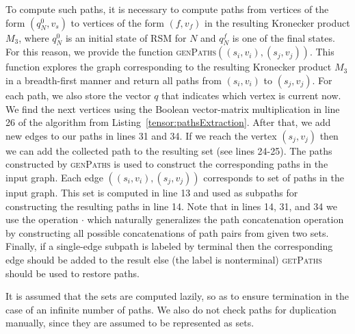To compute such paths, it is necessary to compute paths from vertices of the form $(q_N^0,v_s)$ to vertices of the form $(f, v_f)$ in the resulting Kronecker product $M_3$, where $q_N^0$ is an initial state of RSM for $N$ and $q_N^f$ is one of the final states.
For this reason, we provide the function \textsc{genPaths}$((s_i,v_i),(s_j,v_j))$. This function explores the graph corresponding to the resulting Kronecker product $M_3$ in a breadth-first manner and return all paths from $(s_i,v_i)$ to $(s_j,v_j)$. For each path, we also store the vector $q$ that indicates which vertex is current now. We find the next vertices using the Boolean vector-matrix multiplication in line 26 of the algorithm from Listing~\ref{tensor:pathsExtraction}. After that, we add new edges to our paths in lines 31 and 34. If we reach the vertex $(s_j,v_j)$ then we can add the collected path to the resulting set (see lines 24-25). The paths constructed by \textsc{genPaths} is used to construct the corresponding paths in the input graph. Each edge $((s_i,v_i),(s_j,v_j))$ corresponds to set of paths in the input graph. This set is computed in line 13 and used as subpaths for constructing the resulting paths in line 14. Note that in lines 14, 31, and 34 we use the operation $\cdot$ 
which naturally generalizes the path concatenation operation by constructing all possible concatenations of path pairs from given two sets. Finally, if a single-edge subpath is labeled by terminal then the corresponding edge should be added to the result else (the label is nonterminal) \textsc{getPaths} should be used to restore paths.

It is assumed that the sets are computed lazily, so as to ensure termination in the case of an infinite number of paths.
We also do not check paths for duplication manually, since they are assumed to be represented as sets.